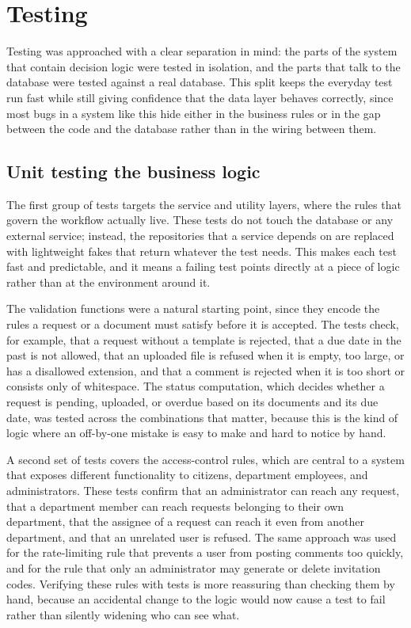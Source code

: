 \section{Testing}

\par Testing was approached with a clear separation in mind: the parts of the system that contain decision logic were tested in isolation, and the parts that talk to the database were tested against a real database. This split keeps the everyday test run fast while still giving confidence that the data layer behaves correctly, since most bugs in a system like this hide either in the business rules or in the gap between the code and the database rather than in the wiring between them.

\subsection{Unit testing the business logic}

\par The first group of tests targets the service and utility layers, where the rules that govern the workflow actually live. These tests do not touch the database or any external service; instead, the repositories that a service depends on are replaced with lightweight fakes that return whatever the test needs. This makes each test fast and predictable, and it means a failing test points directly at a piece of logic rather than at the environment around it.

\par The validation functions were a natural starting point, since they encode the rules a request or a document must satisfy before it is accepted. The tests check, for example, that a request without a template is rejected, that a due date in the past is not allowed, that an uploaded file is refused when it is empty, too large, or has a disallowed extension, and that a comment is rejected when it is too short or consists only of whitespace. The status computation, which decides whether a request is pending, uploaded, or overdue based on its documents and its due date, was tested across the combinations that matter, because this is the kind of logic where an off-by-one mistake is easy to make and hard to notice by hand.

\par A second set of tests covers the access-control rules, which are central to a system that exposes different functionality to citizens, department employees, and administrators. These tests confirm that an administrator can reach any request, that a department member can reach requests belonging to their own department, that the assignee of a request can reach it even from another department, and that an unrelated user is refused. The same approach was used for the rate-limiting rule that prevents a user from posting comments too quickly, and for the rule that only an administrator may generate or delete invitation codes. Verifying these rules with tests is more reassuring than checking them by hand, because an accidental change to the logic would now cause a test to fail rather than silently widening who can see what.

